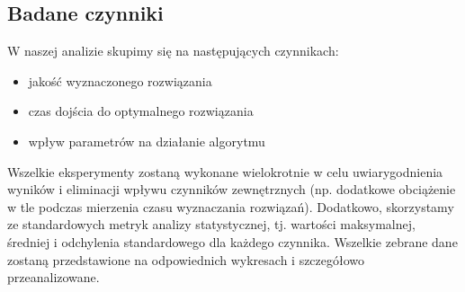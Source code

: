 \documentclass[11pt]{article}
\begin{document}
\subsection{Badane czynniki}
W naszej analizie skupimy się na następujących czynnikach:
\begin{itemize}
\item jakość wyznaczonego rozwiązania
\item czas dojścia do optymalnego rozwiązania
\item wpływ parametrów na działanie algorytmu
\end{itemize}

Wszelkie eksperymenty zostaną wykonane wielokrotnie w celu uwiarygodnienia wyników i eliminacji wpływu czynników zewnętrznych (np. dodatkowe obciążenie w tle podczas mierzenia czasu wyznaczania rozwiązań). Dodatkowo, skorzystamy ze standardowych metryk analizy statystycznej, tj. wartości maksymalnej, średniej i odchylenia standardowego dla każdego czynnika. Wszelkie zebrane dane zostaną przedstawione na odpowiednich wykresach i szczegółowo przeanalizowane.
\end{document}
